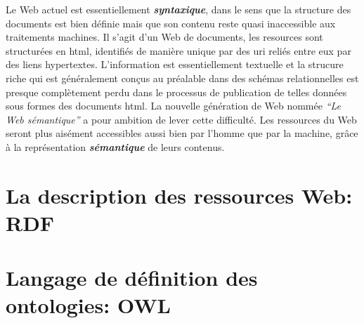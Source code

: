 

Le Web actuel est essentiellement \emph{\textbf{syntaxique}}, dans le
sens que la structure des documents est bien définie mais que son
contenu reste quasi inaccessible aux traitements machines. Il s'agit
d'un Web de documents, les resources sont structurées en
\acrshort{html}, identifiés de manière unique par des \acrshort{uri}
reliés entre eux par des liens hypertextes. L'information est
essentiellement textuelle et la strucure riche qui est généralement
conçus au préalable dans des schémas relationnelles est presque
complètement perdu dans le processus de publication de telles données
sous formes des documents \acrshort{html}. La nouvelle génération de
Web nommée \emph{``Le Web sémantique''} a pour ambition de lever cette
difficulté. Les ressources du Web seront plus aisément accessibles
aussi bien par l'homme que par la machine, grâce à la représentation
\emph{\textbf{sémantique}} de leurs contenus.\medskip

\newpage
\section{La description des ressources Web: RDF}
\label{sec:semantic-web-rdf}

\section{Langage de définition des ontologies: OWL}
\label{sec:semantic-web-owl}






